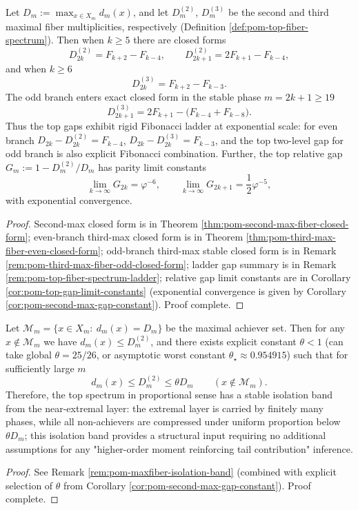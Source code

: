 \begin{conclusion}\label{con:xi-terminal-top-spectrum-fibonacci-ladder-gaps}
Let \(D_m:=\max_{x\in X_m}d_m(x)\), and let \(D_m^{(2)}\), \(D_m^{(3)}\) be the second and third maximal fiber multiplicities, respectively (Definition \ref{def:pom-top-fiber-spectrum}).
Then when \(k\ge 5\) there are closed forms
\[
D_{2k}^{(2)}=F_{k+2}-F_{k-4},\qquad
D_{2k+1}^{(2)}=2F_{k+1}-F_{k-4},
\]
and when \(k\ge 6\)
\[
D_{2k}^{(3)}=F_{k+2}-F_{k-3}.
\]
The odd branch enters exact closed form in the stable phase \(m=2k+1\ge 19\)
\[
D_{2k+1}^{(3)}=2F_{k+1}-\bigl(F_{k-4}+F_{k-8}\bigr).
\]
Thus the top gaps exhibit rigid Fibonacci ladder at exponential scale: for even branch
\(
D_{2k}-D_{2k}^{(2)}=F_{k-4}
\),
\(
D_{2k}-D_{2k}^{(3)}=F_{k-3}
\), and the top two-level gap for odd branch is also explicit Fibonacci combination.
Further, the top relative gap
\(
G_m:=1-D_m^{(2)}/D_m
\)
has parity limit constants
\[
\lim_{k\to\infty}G_{2k}=\varphi^{-6},\qquad
\lim_{k\to\infty}G_{2k+1}=\frac12\varphi^{-5},
\]
with exponential convergence.
\end{conclusion}
\begin{proof}[Proof]
Second-max closed form is in Theorem \ref{thm:pom-second-max-fiber-closed-form};
even-branch third-max closed form is in Theorem \ref{thm:pom-third-max-fiber-even-closed-form};
odd-branch third-max stable closed form is in Remark \ref{rem:pom-third-max-fiber-odd-closed-form};
ladder gap summary is in Remark \ref{rem:pom-top-fiber-spectrum-ladder};
relative gap limit constants are in Corollary \ref{cor:pom-top-gap-limit-constants} (exponential convergence is given by Corollary \ref{cor:pom-second-max-gap-constant}). Proof complete.
\end{proof}

\begin{conclusion}\label{con:xi-terminal-top-spectrum-isolation-band}
Let
\(
\mathcal{M}_m=\{x\in X_m:\ d_m(x)=D_m\}
\)
be the maximal achiever set.
Then for any \(x\notin\mathcal{M}_m\) we have \(d_m(x)\le D_m^{(2)}\), and there exists explicit constant \(\theta<1\) (can take global \(\theta=25/26\), or asymptotic worst constant \(\theta_\star\approx 0.954915\)) such that for sufficiently large \(m\)
\[
d_m(x)\le D_m^{(2)}\le \theta D_m\qquad(x\notin\mathcal{M}_m).
\]
Therefore, the top spectrum in proportional sense has a stable isolation band from the near-extremal layer: the extremal layer is carried by finitely many phases, while all non-achievers are compressed under uniform proportion below \(\theta D_m\);
this isolation band provides a structural input requiring no additional assumptions for any "higher-order moment reinforcing tail contribution" inference.
\end{conclusion}
\begin{proof}[Proof]
See Remark \ref{rem:pom-maxfiber-isolation-band} (combined with explicit selection of \(\theta\) from Corollary \ref{cor:pom-second-max-gap-constant}). Proof complete.
\end{proof}

